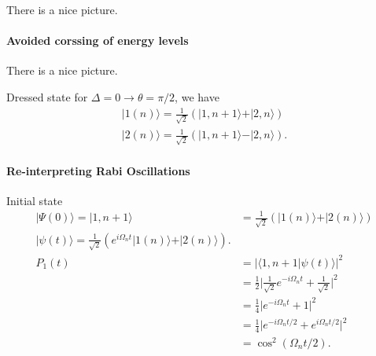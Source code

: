 \documentclass[../../note.tex]{subfiles}
\begin{document}
There is a nice picture.

\paragraph*{Avoided corssing of energy levels}
There is a nice picture.

Dressed state for $\Delta = 0 \rightarrow \theta = \pi/2$, we have
\begin{align}
    \vert 1(n) \rangle =  \frac{1}{\sqrt{2}}(\vert 1, n+1 \rangle + \vert 2, n \rangle)\\
    \vert 2(n) \rangle =  \frac{1}{\sqrt{2}}(\vert 1, n+1 \rangle - \vert 2, n \rangle).
\end{align}

\paragraph*{Re-interpreting Rabi Oscillations}
Initial state
\begin{align}
    \vert \Psi(0) \rangle = \vert 1, n+1 \rangle 
    &= \frac{1}{\sqrt{2}} (\vert 1(n) \rangle + \vert 2(n) \rangle) \\
    \vert \psi(t) \rangle = \frac{1}{\sqrt{2}} (e^{i \Omega_n t} \vert 1(n) \rangle + \vert 2(n) \rangle). \\
    P_1(t) 
    &= \vert \langle 1, n+1 \vert \psi(t) \rangle\vert^2 \\
    &= \frac{1}{2}\vert \frac{1}{\sqrt{2}} e^{-i \Omega_n t} + \frac{1}{\sqrt{2}} \vert^2 \\
    &= \frac{1}{4} \vert e^{-i \Omega_n t} + 1 \vert^2 \\
    &= \frac{1}{4} \vert e^{-i \Omega_n t/2} + e^{i \Omega_n t/2} \vert^2 \\
    &= \cos^2(\Omega_n t/2).
\end{align}
\end{document}
